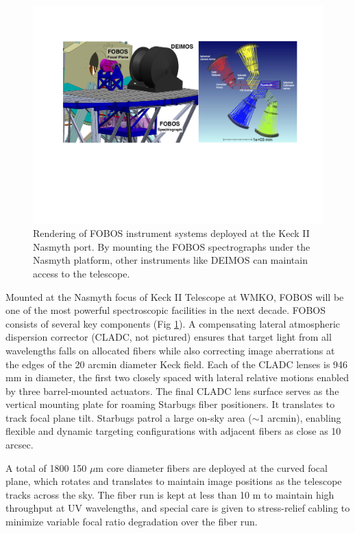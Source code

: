 \documentclass[oneside,11pt]{amsart}
\begin{document}
 \begin{figure}[h!]
  \vskip -0.1in
  \includegraphics[width=\textwidth]{figs/FOBOS_inst.pdf} %
  \caption{\small Rendering of FOBOS instrument systems deployed at the Keck II Nasmyth port.  By mounting the FOBOS spectrographs under the Nasmyth platform, other instruments like DEIMOS can maintain access to the telescope.}\label{fig:layout}
 \end{figure}

Mounted at the Nasmyth focus of Keck II Telescope at WMKO, FOBOS will be one of
the most powerful spectroscopic facilities in the next decade.  FOBOS consists of several key components (Fig
\ref{fig:layout}).  A compensating lateral atmospheric dispersion corrector (CLADC, not pictured) ensures that target
light from all wavelengths falls on allocated fibers while also correcting image aberrations at the edges of the 20
arcmin diameter Keck field.  Each of the CLADC lenses is 946 mm in diameter, the first two closely spaced with lateral
relative motions enabled by three barrel-mounted actuators.  The final CLADC lens surface serves as the vertical
mounting plate for roaming Starbugs fiber positioners.  It translates to track focal plane tilt.  Starbugs patrol a
large on-sky area ($\sim$1 arcmin), enabling flexible and dynamic targeting configurations with adjacent fibers as
close as 10 arcsec.

A total of 1800 150 $\mu$m core diameter fibers are deployed at the curved focal plane, which rotates and translates to
maintain image positions as the telescope tracks across the sky.  The fiber run is kept at less than 10 m to
maintain high throughput at UV wavelengths, and special care is given to stress-relief cabling to minimize variable
focal ratio degradation over the fiber run.
\end{document}

